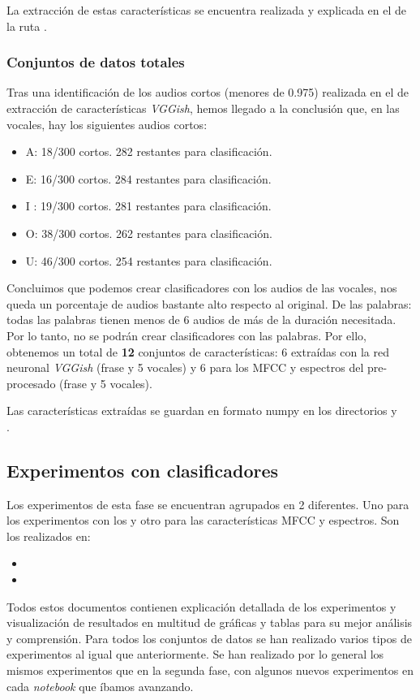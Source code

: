 La extracción de estas características se encuentra realizada y explicada en el  de la ruta .


\subsubsection{Conjuntos de datos totales}
Tras una identificación de los audios cortos (menores de 0.975) realizada en el  de extracción de características \textit{VGGish}, hemos llegado a la conclusión que, en las vocales, hay los siguientes audios cortos:
\begin{itemize}
\item A: 18/300 cortos. 282 restantes para clasificación.
\item E: 16/300 cortos. 284 restantes para clasificación.
\item I : 19/300 cortos. 281 restantes para clasificación.
\item O: 38/300 cortos. 262 restantes para clasificación.
\item U: 46/300 cortos. 254 restantes para clasificación. 
\end{itemize}

Concluimos que podemos crear clasificadores con los audios de las vocales, nos queda un porcentaje de audios bastante alto respecto al original. De las palabras: todas las palabras tienen menos de 6 audios de más de la duración necesitada. Por lo tanto, no se podrán crear clasificadores con las palabras. Por ello, obtenemos un total de \textbf{12} conjuntos de características: 6 extraídas con la red neuronal \textit{VGGish} (frase y 5 vocales) y 6 para los MFCC y espectros del pre-procesado (frase y 5 vocales).

Las características extraídas se guardan en formato numpy en los directorios  y \\ .


\subsection{Experimentos con clasificadores}
Los experimentos de esta fase se encuentran agrupados en 2  diferentes. Uno para los experimentos con los  y otro para las características MFCC y espectros. Son los realizados en:
\begin{itemize}
\item {}
\item {}
\end{itemize} 
Todos estos documentos contienen explicación detallada de los experimentos y visualización de resultados en multitud de gráficas y tablas para su mejor análisis y comprensión. Para todos los conjuntos de datos se han realizado varios tipos de experimentos al igual que anteriormente. Se han realizado por lo general los mismos experimentos que en la segunda fase, con algunos nuevos experimentos en cada \textit{notebook} que íbamos avanzando.

